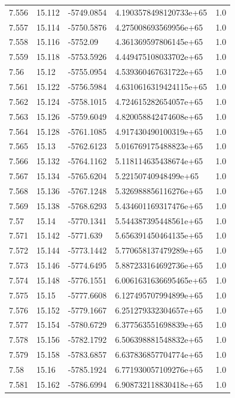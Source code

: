 \begin{tabular}{lllll}
7.556 & 15.112 & -5749.0854 & 4.1903578498120733e+65 & 1.0 \\
7.557 & 15.114 & -5750.5876 & 4.275008693569956e+65 & 1.0 \\
7.558 & 15.116 & -5752.09 & 4.361369597806145e+65 & 1.0 \\
7.559 & 15.118 & -5753.5926 & 4.449475108033702e+65 & 1.0 \\
7.56 & 15.12 & -5755.0954 & 4.539360467631722e+65 & 1.0 \\
7.561 & 15.122 & -5756.5984 & 4.6310616319424115e+65 & 1.0 \\
7.562 & 15.124 & -5758.1015 & 4.724615282654057e+65 & 1.0 \\
7.563 & 15.126 & -5759.6049 & 4.820058842474608e+65 & 1.0 \\
7.564 & 15.128 & -5761.1085 & 4.917430490100319e+65 & 1.0 \\
7.565 & 15.13 & -5762.6123 & 5.016769175488823e+65 & 1.0 \\
7.566 & 15.132 & -5764.1162 & 5.118114635438674e+65 & 1.0 \\
7.567 & 15.134 & -5765.6204 & 5.22150740948499e+65 & 1.0 \\
7.568 & 15.136 & -5767.1248 & 5.326988856116276e+65 & 1.0 \\
7.569 & 15.138 & -5768.6293 & 5.434601169317476e+65 & 1.0 \\
7.57 & 15.14 & -5770.1341 & 5.544387395448561e+65 & 1.0 \\
7.571 & 15.142 & -5771.639 & 5.656391450464135e+65 & 1.0 \\
7.572 & 15.144 & -5773.1442 & 5.770658137479289e+65 & 1.0 \\
7.573 & 15.146 & -5774.6495 & 5.887233164692736e+65 & 1.0 \\
7.574 & 15.148 & -5776.1551 & 6.0061631636695465e+65 & 1.0 \\
7.575 & 15.15 & -5777.6608 & 6.127495707994899e+65 & 1.0 \\
7.576 & 15.152 & -5779.1667 & 6.251279332304657e+65 & 1.0 \\
7.577 & 15.154 & -5780.6729 & 6.377563551698839e+65 & 1.0 \\
7.578 & 15.156 & -5782.1792 & 6.506398881548832e+65 & 1.0 \\
7.579 & 15.158 & -5783.6857 & 6.637836857704774e+65 & 1.0 \\
7.58 & 15.16 & -5785.1924 & 6.771930057109276e+65 & 1.0 \\
7.581 & 15.162 & -5786.6994 & 6.908732118830418e+65 & 1.0 \\

\end{tabular}
